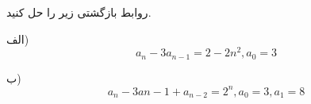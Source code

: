 \EXERCISE
روابط بازگشتی زیر را حل کنید.

الف)
$$a_n - 3a_{n-1} = 2 - 2n^2, a_0 = 3$$


ب)
$$a_n - 3a{n-1} + a_{n-2} = 2^n, a_0 = 3, a_1 = 8$$